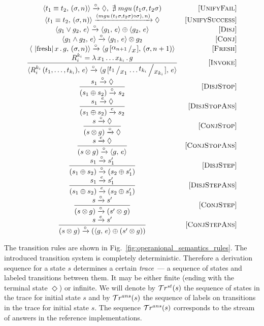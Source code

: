 \begin{figure*}
  \renewcommand{\arraystretch}{1.6}
  \[
  \begin{array}{cr}
    \taskst{t_1 \equiv t_2}{(\sigma, n)} \xrightarrow{\circ} \Diamond , \, \, \nexists\; mgu\,(t_1 \sigma, t_2 \sigma) &\ruleno{UnifyFail} \\
    \taskst{t_1 \equiv t_2}{(\sigma, n)} \xrightarrow{(mgu\,(t_1 \sigma, t_2 \sigma) \circ \sigma),\, n)} \Diamond & \ruleno{UnifySuccess} \\
    \taskst{g_1 \lor g_2}{e} \xrightarrow{\circ} \taskst{g_1}{e} \oplus \taskst{g_2}{e} & \ruleno{Disj} \\
    \taskst{g_1 \land g_2}{e} \xrightarrow{\circ} \taskst{g_1}{e} \otimes g_2 & \ruleno{Conj} \\
    \taskst{\mbox{\lstinline|fresh|}\, x\, .\, g}{(\sigma, n)} \xrightarrow{\circ} \taskst{g\,[\bigslant{\alpha_{n + 1}}{x}]}{( \sigma, n + 1)} & \ruleno{Fresh} \\
    \dfrac{R_i^{k_i}=\lambda\,x_1\dots x_{k_i}\,.\,g}{\taskst{R_i^{k_i}\,(t_1,\dots,t_{k_i})}{e} \xrightarrow{\circ} \taskst{g\,[\bigslant{t_1}{x_1}\dots\bigslant{t_{k_i}}{x_{k_i}}]}{e}} & \ruleno{Invoke}\\
    \dfrac{s_1 \xrightarrow{\circ} \Diamond}{(s_1 \oplus s_2) \xrightarrow{\circ} s_2} & \ruleno{DisjStop}\\
    \dfrac{s_1 \xrightarrow{e} \Diamond}{(s_1 \oplus s_2) \xrightarrow{e} s_2} & \ruleno{DisjStopAns}\\
    \dfrac{s \xrightarrow{\circ} \Diamond}{(s \otimes g) \xrightarrow{\circ} \Diamond} &\ruleno{ConjStop}\\
    \dfrac{s \xrightarrow{e} \Diamond}{(s \otimes g) \xrightarrow{\circ} \taskst{g}{e}}  & \ruleno{ConjStopAns}\\
    \dfrac{s_1 \xrightarrow{\circ} s'_1}{(s_1 \oplus s_2) \xrightarrow{\circ} (s_2 \oplus s'_1)} &\ruleno{DisjStep}\\
    \dfrac{s_1 \xrightarrow{e} s'_1}{(s_1 \oplus s_2) \xrightarrow{e} (s_2 \oplus s'_1)} &\ruleno{DisjStepAns}\\
    \dfrac{s \xrightarrow{\circ} s'}{(s \otimes g) \xrightarrow{\circ} (s' \otimes g)} &\ruleno{ConjStep}\\
    \dfrac{s \xrightarrow{e} s'}{(s \otimes g) \xrightarrow{\circ} (\taskst{g}{e} \oplus (s' \otimes g))} & \ruleno{ConjStepAns} 
  \end{array}
  \]
  \caption{Operational semantics of interleaving search}
  \label{fig:operanional_semantics_rules}
\end{figure*}

The transition rules are shown in Fig.~\ref{fig:operanional_semantics_rules}.
The introduced transition system is completely deterministic.
Therefore a derivation sequence for a state $s$ determines a certain \emph{trace}~--- a sequence of states and labeled transitions between
them.
It may be either finite (ending with the terminal state $\Diamond$) or infinite.
We will denote by $\mathcal{T}r^{st}(s)$ the sequence of states in the trace for initial state $s$ and by $\mathcal{T}r^{ans}(s)$ the sequence of labels on
transitions in the trace for initial state $s$.
The sequence $\mathcal{T}r^{ans}(s)$ corresponds to the stream of answers in the reference \mK implementations.
